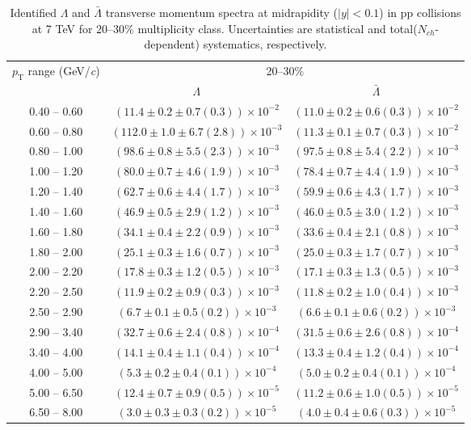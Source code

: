 \begin{table}
\caption{Identified $\Lambda$ and $\bar{\Lambda}$  transverse momentum spectra at midrapidity ($|y|<0.1$) in pp collisions at 7 TeV for 20--30\% multiplicity class. Uncertainties are statistical and total($N_{ch}$-dependent) systematics, respectively.}
\label{tab:Lambda_AntiLambda_20to30}
\begin{center}
\begin{tabular}{ c | c c }
\hline
\multirow{2}{*}{$p_{\mathrm{T}}$ range (GeV/\textit{c})} & \multicolumn{2}{c}{20--30\%} \\ & $\Lambda$& $\bar{\Lambda}$\\ 
\hline
0.40 -- 0.60 & $(11.4\pm0.2\pm0.7(0.3))\times10^{-2}$ & $(11.0\pm0.2\pm0.6(0.3))\times10^{-2}$ \\ 
0.60 -- 0.80 & $(112.0\pm1.0\pm6.7(2.8))\times10^{-3}$ & $(11.3\pm0.1\pm0.7(0.3))\times10^{-2}$ \\ 
0.80 -- 1.00 & $(98.6\pm0.8\pm5.5(2.3))\times10^{-3}$ & $(97.5\pm0.8\pm5.4(2.2))\times10^{-3}$ \\ 
1.00 -- 1.20 & $(80.0\pm0.7\pm4.6(1.9))\times10^{-3}$ & $(78.4\pm0.7\pm4.4(1.9))\times10^{-3}$ \\ 
1.20 -- 1.40 & $(62.7\pm0.6\pm4.4(1.7))\times10^{-3}$ & $(59.9\pm0.6\pm4.3(1.7))\times10^{-3}$ \\ 
1.40 -- 1.60 & $(46.9\pm0.5\pm2.9(1.2))\times10^{-3}$ & $(46.0\pm0.5\pm3.0(1.2))\times10^{-3}$ \\ 
1.60 -- 1.80 & $(34.1\pm0.4\pm2.2(0.9))\times10^{-3}$ & $(33.6\pm0.4\pm2.1(0.8))\times10^{-3}$ \\ 
1.80 -- 2.00 & $(25.1\pm0.3\pm1.6(0.7))\times10^{-3}$ & $(25.0\pm0.3\pm1.7(0.7))\times10^{-3}$ \\ 
2.00 -- 2.20 & $(17.8\pm0.3\pm1.2(0.5))\times10^{-3}$ & $(17.1\pm0.3\pm1.3(0.5))\times10^{-3}$ \\ 
2.20 -- 2.50 & $(11.9\pm0.2\pm0.9(0.3))\times10^{-3}$ & $(11.8\pm0.2\pm1.0(0.4))\times10^{-3}$ \\ 
2.50 -- 2.90 & $(6.7\pm0.1\pm0.5(0.2))\times10^{-3}$ & $(6.6\pm0.1\pm0.6(0.2))\times10^{-3}$ \\ 
2.90 -- 3.40 & $(32.7\pm0.6\pm2.4(0.8))\times10^{-4}$ & $(31.5\pm0.6\pm2.6(0.8))\times10^{-4}$ \\ 
3.40 -- 4.00 & $(14.1\pm0.4\pm1.1(0.4))\times10^{-4}$ & $(13.3\pm0.4\pm1.2(0.4))\times10^{-4}$ \\ 
4.00 -- 5.00 & $(5.3\pm0.2\pm0.4(0.1))\times10^{-4}$ & $(5.0\pm0.2\pm0.4(0.1))\times10^{-4}$ \\ 
5.00 -- 6.50 & $(12.4\pm0.7\pm0.9(0.5))\times10^{-5}$ & $(11.2\pm0.6\pm1.0(0.5))\times10^{-5}$ \\ 
6.50 -- 8.00 & $(3.0\pm0.3\pm0.3(0.2))\times10^{-5}$ & $(4.0\pm0.4\pm0.6(0.3))\times10^{-5}$ \\ 
\hline
\end{tabular}
\end{center}
\end{table}
 

